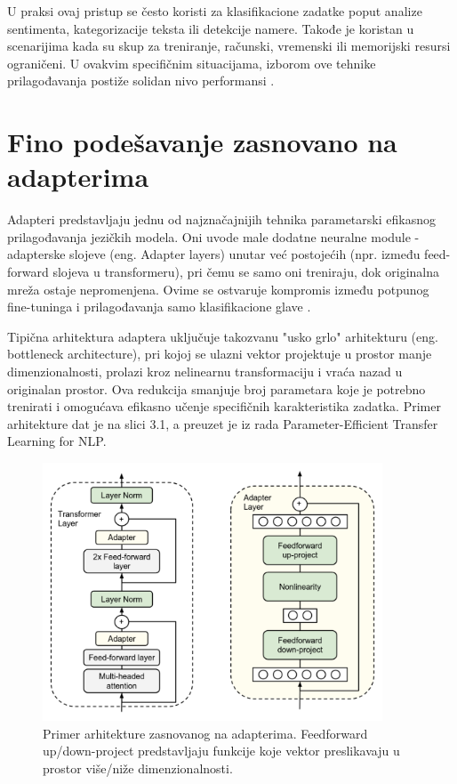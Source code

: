 \documentclass[12pt,oneside]{memoir}
\begin{document}
U praksi ovaj pristup se često koristi za klasifikacione zadatke poput analize sentimenta, kategorizacije teksta ili detekcije namere. Takođe je koristan u scenarijima kada su skup za treniranje, računski, vremenski ili memorijski resursi ograničeni. U ovakvim specifičnim situacijama, izborom ove tehnike prilagođavanja postiže solidan nivo performansi \cite{zaken2022bitfitspeft}. 

\section {Fino podešavanje zasnovano na adapterima}
Adapteri predstavljaju jednu od najznačajnijih tehnika parametarski efikasnog prilagođavanja jezičkih modela. Oni uvode male dodatne neuralne module - adapterske slojeve (eng. Adapter layers) unutar već postojećih (npr. između feed-forward slojeva u transformeru), pri čemu se samo oni treniraju, dok originalna mreža ostaje nepromenjena. Ovime se ostvaruje kompromis između potpunog fine-tuninga i prilagođavanja samo klasifikacione glave \cite{AdaptersTechnique}.

Tipična arhitektura adaptera uključuje takozvanu "usko grlo" arhitekturu (eng. bottleneck architecture), pri kojoj se ulazni vektor projektuje u prostor manje dimenzionalnosti, prolazi kroz nelinearnu transformaciju i vraća nazad u originalan prostor. Ova redukcija smanjuje broj parametara koje je potrebno trenirati i omogućava efikasno učenje specifičnih karakteristika zadatka. Primer arhitekture dat je na slici 3.1, a preuzet je iz rada Parameter-Efficient Transfer Learning for {NLP}\cite{AdaptersTechnique}.

\begin{figure}[!ht]
	\centering
	\label{fig:AdaptersExample}
	\includegraphics[width=0.9\textwidth]{Adapters_Example.png}
	\caption{Primer arhitekture zasnovanog na adapterima. Feedforward up/down-project predstavljaju funkcije koje vektor preslikavaju u prostor više/niže dimenzionalnosti. }
\end{figure}
\end{document}
